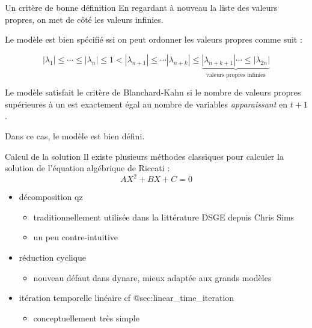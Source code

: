 \documentclass[
  ignorenonframetext,
]{beamer}
\providecommand{\tightlist}{%
  \setlength{\itemsep}{0pt}\setlength{\parskip}{0pt}}
\begin{document}
\begin{frame}{Un critère de bonne définition}
\label{un-crituxe8re-de-bonne-duxe9finition}
En regardant à nouveau la liste des valeurs propres, on met de côté les
valeurs infinies.

Le modèle est bien spécifié ssi on peut ordonner les valeurs propres
comme suit :

\[|\lambda_1| \leq \cdots \leq |\lambda_{n}| \leq 1 < |\lambda_{n+1}| \leq \cdots  |\lambda_{n+k}| \leq \underbrace{|\lambda_{n+k+1}| \cdots \leq |\lambda_{2 n}|}_{\text{valeurs propres infinies}}\]

\begin{tcolorbox}[enhanced jigsaw, leftrule=.75mm, opacitybacktitle=0.6, rightrule=.15mm, colback=white, coltitle=black, bottomtitle=1mm, colbacktitle=quarto-callout-note-color!10!white, title=\textcolor{quarto-callout-note-color}{\faInfo}\hspace{0.5em}{Critère de Blanchard-Kahn}, colframe=quarto-callout-note-color-frame, arc=.35mm, left=2mm, toprule=.15mm, titlerule=0mm, breakable, toptitle=1mm, opacityback=0, bottomrule=.15mm]

Le modèle satisfait le critère de Blanchard-Kahn si le nombre de valeurs
propres supérieures à un est exactement égal au nombre de variables
\emph{apparaissant} en \(t+1\).

Dans ce cas, le modèle est bien défini.

\end{tcolorbox}
\end{frame}

\begin{frame}{Calcul de la solution}
\label{calcul-de-la-solution}
Il existe plusieurs méthodes classiques pour calculer la solution de
l'équation algébrique de Riccati : \[A X^2+ B X + C=0\]

\begin{itemize}
\tightlist
\item
  décomposition qz

  \begin{itemize}
  \tightlist
  \item
    traditionnellement utilisée dans la littérature DSGE depuis Chris
    Sims
  \item
    un peu contre-intuitive
  \end{itemize}
\item
  réduction cyclique

  \begin{itemize}
  \tightlist
  \item
    nouveau défaut dans dynare, mieux adaptée aux grands modèles
  \end{itemize}
\item
  itération temporelle linéaire cf @sec:linear\_time\_iteration

  \begin{itemize}
  \tightlist
  \item
    conceptuellement très simple
  \end{itemize}
\end{itemize}
\end{frame}
\end{document}
